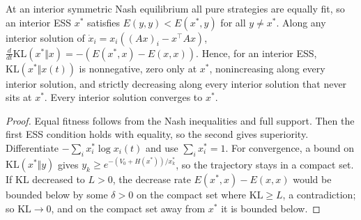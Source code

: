 \begin{theorem}
\label{thm:beh-replicator}
\leanok
{}
At an interior symmetric Nash equilibrium all pure strategies are equally fit, so an interior ESS $x^*$ satisfies
$E(y,y)<E(x^*,y)$ for all $y\ne x^*$. Along any interior solution of $\dot x_i=x_i((Ax)_i-x^\top Ax)$,
$\frac{d}{dt}\mathrm{KL}(x^*\Vert x)=-(E(x^*,x)-E(x,x))$. Hence, for an interior ESS, $\mathrm{KL}(x^*\Vert x(t))$
is nonnegative, zero only at $x^*$, nonincreasing along every interior solution, and strictly decreasing along
every interior solution that never sits at $x^*$. Every interior solution converges to $x^*$.
\end{theorem}
\begin{proof}
\leanok
Equal fitness follows from the Nash inequalities and full support. Then the first ESS condition holds with equality,
so the second gives superiority. Differentiate $-\sum_ix_i^*\log x_i(t)$ and use $\sum_ix^*_i=1$. For convergence,
a bound on $\mathrm{KL}(x^*\Vert y)$ gives $y_k\ge e^{-(V_0+H(x^*))/x^*_k}$, so the trajectory stays in a compact set.
If $\mathrm{KL}$ decreased to $L>0$, the decrease rate $E(x^*,x)-E(x,x)$ would be bounded below by some $\delta>0$ on
the compact set where $\mathrm{KL}\ge L$, a contradiction; so $\mathrm{KL}\to0$, and on the compact set away from $x^*$
it is bounded below.
\end{proof}


